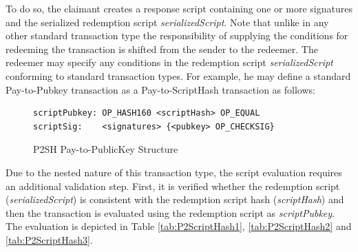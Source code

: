 \noindent
To do so, the claimant creates a response script containing one or more signatures and the serialized redemption script \textit{serializedScript}. Note that unlike in any other standard transaction type the responsibility of supplying the conditions for redeeming the transaction is shifted from the sender to the redeemer. The redeemer may specify any conditions in the redemption script \textit{serializedScript} conforming to standard transaction types. For example, he may define a standard Pay-to-Pubkey transaction as a Pay-to-ScriptHash transaction as follows:

\vspace{-10pt}
\begin{figure}[htbp]

\begin{Verbatim}[fontsize==\relsize{-4}, frame=single]  
scriptPubkey: OP_HASH160 <scriptHash> OP_EQUAL
scriptSig:    <signatures> {<pubkey> OP_CHECKSIG}
\end{Verbatim}

\vspace{-15pt}
\caption{P2SH Pay-to-PublicKey Structure}
\label{fig:P2ScriptHashStructure-P2PK}
\end{figure}
\vspace{-10pt}

\noindent
Due to the nested nature of this transaction type, the script evaluation requires an additional validation step. First, it is verified whether the redemption script (\textit{serializedScript}) is consistent with the redemption script hash (\textit{scriptHash}) and then the transaction is evaluated using the redemption script as \textit{scriptPubkey}. The evaluation is depicted in Table \ref{tab:P2ScriptHash1}, \ref{tab:P2ScriptHash2} and \ref{tab:P2ScriptHash3}.


